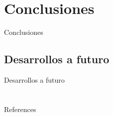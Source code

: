 \documentclass[spanish,a4paper]{beamer}%
\makeatletter
\def\beamer@writeslidentry@miniframesoff{%
  \expandafter\beamer@ifempty\expandafter{\beamer@framestartpage}{}%
  {%
    \clearpage\beamer@notesactions%
  }
}
\newcommand*{\miniframesoff}{\let\beamer@writeslidentry=\beamer@writeslidentry@miniframesoff}
\makeatother
\begin{document}
	\section{Conclusiones}
	\begin{frame}{Conclusiones}
	\end{frame}
	\subsection*{Desarrollos a futuro}
	\begin{frame}{Desarrollos a futuro}

	\end{frame}
	\miniframesoff
	\section{}
	\begin{frame}{References}
        
				\tiny
        
				
\end{frame}
\end{document}
